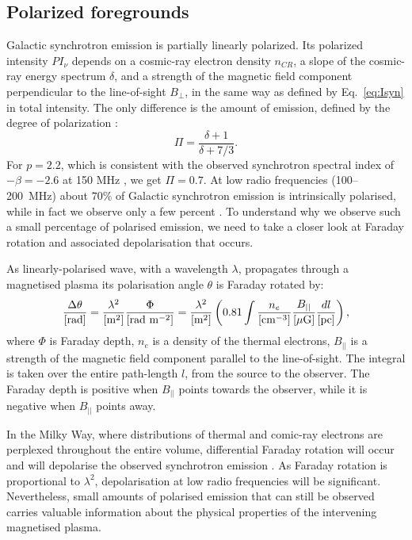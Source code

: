 \subsection{Polarized foregrounds}\label{sec:polarfg}
Galactic synchrotron emission is partially linearly polarized. Its polarized intensity $PI_\nu$ depends on a cosmic-ray electron density $n_{CR}$, a slope of the cosmic-ray energy spectrum $\delta$, and a strength of the magnetic field component perpendicular to the line-of-sight $B_\perp$, in the same way as defined by Eq.~\ref{eq:Isyn} in total intensity. The only difference is the amount of emission, defined by the degree of polarization \cite{rybicki86}:
\begin{equation}
\Pi=\frac{\delta+1}{\delta+7/3}.
\end{equation}
For $p=2.2$, which is consistent with the observed synchrotron spectral index of $-\beta=-2.6$ at 150 MHz \cite{mozdzen17}, we get $\Pi=0.7$. At low radio frequencies  (100--200~MHz) about $70\%$ of Galactic synchrotron emission is intrinsically polarised, while in fact we observe only a few percent \cite{bernardi13, jelic14, jelic15, lenc16, vaneck17,vaneck19}. To understand why we observe such a small percentage of polarised emission, we need to take a closer look at Faraday rotation and associated depolarisation that occurs. 

As linearly-polarised wave, with a wavelength $\lambda$, propagates through a magnetised plasma its polarisation angle $\theta$ is Faraday rotated by:
\begin{equation}\label{eq:FR}
\frac{\Delta \theta}{\rm [rad]}= \frac{\lambda^2}{\rm [m^2]}\frac{\Phi}{\rm [rad~m^{-2}]}=  \frac{\lambda^2}{\rm [m^2]}\left(0.81\int \frac{n_e}{\rm [cm^{-3}]} \frac{B_{||}}{\rm [\mu G]} \frac{dl}{\rm [pc]}\right),
\end{equation}
where $\Phi$ is Faraday depth, $n_e$ is a density of the thermal electrons, $B_{||}$ is a strength of the magnetic field component parallel to the line-of-sight. The integral is taken over the entire path-length $l$, from the source to the observer.  The Faraday depth is positive when $B_{||}$ points towards the observer, while it is negative when $B_{||}$ points away.

In the Milky Way, where distributions of thermal and comic-ray electrons are perplexed throughout the entire volume, differential Faraday rotation will occur and will depolarise the observed synchrotron emission \cite{sokoloff98}.  As Faraday rotation is proportional to $\lambda^2$, depolarisation at low radio frequencies will be significant. 
Nevertheless, small amounts of polarised emission that can still be observed carries valuable information about the physical properties of the intervening magnetised plasma.

